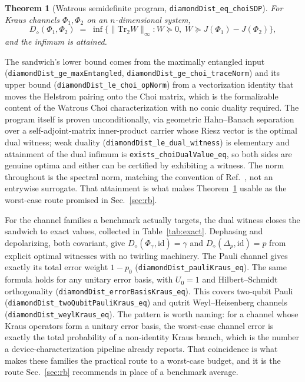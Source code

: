 \documentclass[aps,pra,reprint,nofootinbib,superscriptaddress]{revtex4-2}
\theoremstyle{plain}
\newtheorem{theorem}{Theorem}
\theoremstyle{definition}
\theoremstyle{remark}
\newcommand{\lean}[1]{\texttt{#1}}
\newcommand{\opnorm}[1]{\lVert #1 \rVert_{\infty}}
\newcommand{\ddist}{D_{\diamond}}
\begin{document}
\begin{theorem}[Watrous semidefinite program,
\lean{diamondDist\_eq\_choiSDP}]
\label{thm:sdp}
For Kraus channels $\Phi_1,\Phi_2$ on an $n$-dimensional system,
\[
\ddist(\Phi_1,\Phi_2) \;=\;
\inf\{\opnorm{\mathrm{Tr}_2 W} :
W \succeq 0,\; W \succeq J(\Phi_1)-J(\Phi_2)\},
\]
and the infimum is attained.
\end{theorem}

The sandwich's lower bound comes from the maximally entangled input
(\lean{diamondDist\_ge\_maxEntangled},
\lean{diamondDist\_ge\_choi\_traceNorm}) and its upper bound
(\lean{diamondDist\_le\_choi\_opNorm}) from a vectorization identity that
moves the Helstrom pairing onto the Choi matrix, which is the
formalizable content of the Watrous Choi characterization with no conic
duality required. The program itself is proven unconditionally, via
geometric Hahn--Banach separation over a self-adjoint-matrix
inner-product carrier whose Riesz vector is the optimal dual witness;
weak duality (\lean{diamondDist\_le\_dual\_witness}) is elementary and
attainment of the dual infimum is \lean{exists\_choiDualValue\_eq}, so
both sides are genuine optima and either can be certified by exhibiting a
witness. The norm throughout is the spectral norm, matching the
convention of Ref.~\cite{Watrous2018}, not an entrywise surrogate. That
attainment is what makes Theorem~\ref{thm:sdp} usable as the worst-case
route promised in Sec.~\ref{sec:rb}.

For the channel families a benchmark actually targets, the dual witness
closes the sandwich to exact values, collected in
Table~\ref{tab:exact}. Dephasing and depolarizing, both covariant, give
$\ddist(\Phi_\gamma,\mathrm{id}) = \gamma$ and
$\ddist(\Delta_p,\mathrm{id}) = p$ from explicit optimal witnesses with
no twirling machinery. The Pauli channel gives exactly its total error
weight $1-p_0$ (\lean{diamondDist\_pauliKraus\_eq}). The same formula holds
for any unitary error basis, with $U_0 = 1$ and Hilbert--Schmidt
orthogonality (\lean{diamondDist\_errorBasisKraus\_eq}). This covers
two-qubit Pauli (\lean{diamondDist\_twoQubitPauliKraus\_eq}) and qutrit
Weyl--Heisenberg channels (\lean{diamondDist\_weylKraus\_eq}). The
pattern is worth naming: for a channel whose Kraus operators form a
unitary error basis, the worst-case channel error is exactly the total
probability of a non-identity Kraus branch, which is the number a
device-characterization pipeline already reports. That coincidence is
what makes these families the practical route to a worst-case budget, and
it is the route Sec.~\ref{sec:rb} recommends in place of a benchmark
average.
\end{document}
